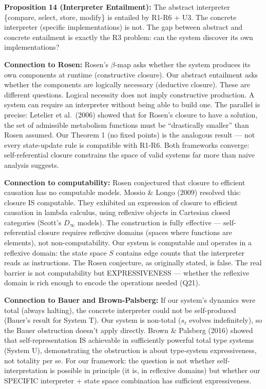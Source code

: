 \documentclass[
  11pt,
]{article}
\begin{document}
\textbf{Proposition 14 (Interpreter Entailment):} The abstract
interpreter \{compare, select, store, modify\} is entailed by R1-R6 +
U3. The concrete interpreter (specific implementations) is not. The gap
between abstract and concrete entailment is exactly the R3 problem: can
the system discover its own implementations?

\textbf{Connection to Rosen:} Rosen's \(\beta\)-map asks whether the
system produces its own components at runtime (constructive closure).
Our abstract entailment asks whether the components are logically
necessary (deductive closure). These are different questions. Logical
necessity does not imply constructive production. A system can require
an interpreter without being able to build one. The parallel is precise:
Letelier et al.~(2006) showed that for Rosen's closure to have a
solution, the set of admissible metabolism functions must be
``drastically smaller'' than Rosen assumed. Our Theorem 1 (no fixed
points) is the analogous result --- not every state-update rule is
compatible with R1-R6. Both frameworks converge: self-referential
closure constrains the space of valid systems far more than naive
analysis suggests.

\textbf{Connection to computability:} Rosen conjectured that closure to
efficient causation has no computable models. Mossio \& Longo (2009)
resolved this: closure IS computable. They exhibited an expression of
closure to efficient causation in lambda calculus, using reflexive
objects in Cartesian closed categories (Scott's \(D_\infty\) models).
The construction is fully effective --- self-referential closure
requires reflexive domains (spaces where functions are elements), not
non-computability. Our system is computable and operates in a reflexive
domain: the state space \(S\) contains edge counts that the interpreter
reads as instructions. The Rosen conjecture, as originally stated, is
false. The real barrier is not computability but EXPRESSIVENESS ---
whether the reflexive domain is rich enough to encode the operations
needed (Q21).

\textbf{Connection to Bauer and Brown-Palsberg:} If our system's
dynamics were total (always halting), the concrete interpreter could not
be self-produced (Bauer's result for System T). Our system is non-total
(\(s_t\) evolves indefinitely), so the Bauer obstruction doesn't apply
directly. Brown \& Palsberg (2016) showed that self-representation IS
achievable in sufficiently powerful total type systems (System U),
demonstrating the obstruction is about type-system expressiveness, not
totality per se. For our framework: the question is not whether
self-interpretation is possible in principle (it is, in reflexive
domains) but whether our SPECIFIC interpreter + state space combination
has sufficient expressiveness.
\end{document}
